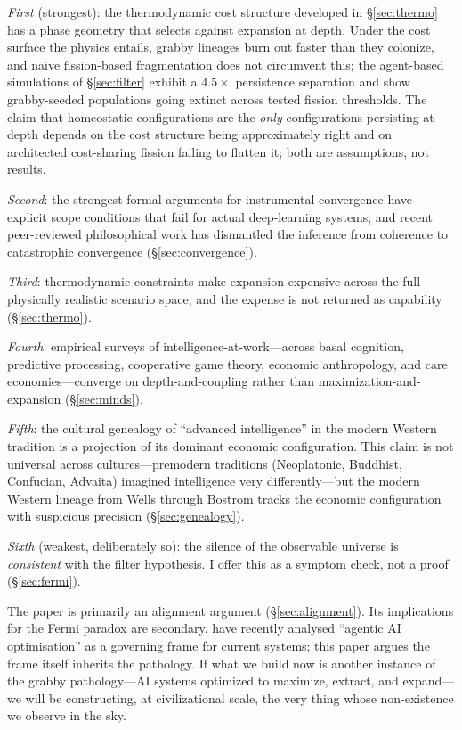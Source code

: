 \documentclass[11pt,a4paper,twocolumn]{article}
\begin{document}
\emph{First} (strongest): the thermodynamic cost structure developed
in \S\ref{sec:thermo} has a phase geometry that selects against
expansion at depth. Under the cost surface the physics entails,
grabby lineages burn out faster than they colonize, and naive
fission-based fragmentation does not circumvent this; the agent-based
simulations of \S\ref{sec:filter} exhibit a $4.5\times$ persistence
separation and show grabby-seeded populations going extinct across
tested fission thresholds. The claim that homeostatic configurations
are the \emph{only} configurations persisting at depth depends on the
cost structure being approximately right and on architected
cost-sharing fission failing to flatten it; both are assumptions, not
results.

\emph{Second}: the strongest formal arguments for instrumental
convergence have explicit scope conditions that fail for actual
deep-learning systems, and recent peer-reviewed philosophical work
has dismantled the inference from coherence to catastrophic
convergence (\S\ref{sec:convergence}).

\emph{Third}: thermodynamic constraints make expansion expensive
across the full physically realistic scenario space, and the
expense is not returned as capability (\S\ref{sec:thermo}).

\emph{Fourth}: empirical surveys of intelligence-at-work---across
basal cognition, predictive processing, cooperative game theory,
economic anthropology, and care economies---converge on
depth-and-coupling rather than maximization-and-expansion
(\S\ref{sec:minds}).

\emph{Fifth}: the cultural genealogy of ``advanced intelligence''
in the modern Western tradition is a projection of its dominant
economic configuration. This claim is not universal across
cultures---premodern traditions (Neoplatonic, Buddhist, Confucian,
Advaita) imagined intelligence very differently---but the modern
Western lineage from Wells through Bostrom tracks the economic
configuration with suspicious precision (\S\ref{sec:genealogy}).

\emph{Sixth} (weakest, deliberately so): the silence of the
observable universe is \emph{consistent} with the filter hypothesis.
I offer this as a symptom check, not a proof (\S\ref{sec:fermi}).

The paper is primarily an alignment argument (\S\ref{sec:alignment}). Its
implications for the Fermi paradox are secondary. \citet{floridi2026}
have recently analysed ``agentic AI optimisation'' as a governing frame
for current systems; this paper argues the frame itself inherits the
pathology. If what we build now is another instance of the grabby
pathology---AI systems optimized to maximize, extract, and expand---we
will be constructing, at civilizational scale, the very thing whose
non-existence we observe in the sky.
\end{document}
